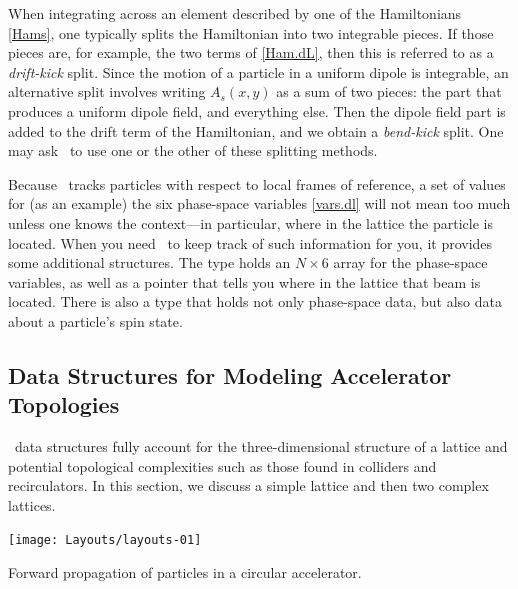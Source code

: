 When integrating across an element described by one of the
Hamiltonians \eqref{Hams}, one typically splits the Hamiltonian
into two integrable pieces.%
\cite{McLachlan:2002:SplitMeth}
If those pieces are, for example, the two terms of \eqref{Ham.dL},
then this is referred to as a \emph{drift-kick} split. Since the
motion of a particle in a uniform dipole is integrable, an
alternative split involves writing $A_s(x,y)$ as a sum of two
pieces: the part that produces a uniform dipole field, and everything
else. Then the dipole field part is added to the drift term of
the Hamiltonian, and we obtain a \emph{bend-kick} split.%
\cite{Forest:1998:BeamDyn,Forest:2006:GeomIntegPA}
One may ask \PTC\ to use one or the other of these splitting methods.

 Because \PTC\ tracks particles
with respect to local frames of reference, a set of values for
(as an example) the six phase-space variables \eqref{vars.dl} will not mean
too much unless one knows the context---in particular, where in
the lattice the particle is located. When you need \PTC\ to keep
track of such information for you, it provides some additional
structures. The type  holds an $N\times6$ array for the phase-space
variables, as well as a pointer that tells you where in the lattice
that beam is located. There is also a type  that holds not only
phase-space data, but also data about a particle's spin state.


\subsection{Data Structures for Modeling Accelerator Topologies}

%
\PTC\ data structures fully account for the three-dimensional
structure of a lattice and potential topological complexities
such as those found in colliders and recirculators. In this section,
we discuss a simple lattice and then two complex lattices.

\begin{marginfigure}[0\baselineskip]\forcerectofloat
  \centering
  \texttt{[image: Layouts/layouts-01]}
  \caption{Forward propagation of particles in a circular accelerator.}
  \label{fig:accel.simple}
\end{marginfigure}

